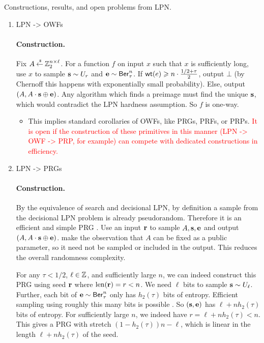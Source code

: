 \noindent Constructions, results, and open problems from LPN. 
\begin{enumerate}
	\item LPN -> OWFs
	\paragraph{Construction.} Fix $A\mathbin{\stackrel{\mbox{\,\tiny \$}}{\gets}} {\mathbb Z}_2^{n\times \ell}$.
	For a function $f$ on input $x$ such that $x$ is sufficiently long, use $x$ to sample ${\mathbf s} \sim U_r$ and ${\mathbf e} \sim \mathsf{Ber}_\tau^n$.
	If $\mathsf{wt}(e) \geqslant n\cdot \frac{1/2+\tau}{2}$, output $\bot$ (by Chernoff this happens with exponentially small probability).
	Else, output $(A, A\cdot{\mathbf s}\oplus{\mathbf e})$.
	Any algorithm which finds a preimage must find the unique ${\mathbf s}$, which would contradict the LPN hardness assumption.
	So $f$ is one-way.
	\begin{itemize}
		\item This implies standard corollaries of OWFs, like PRGs, PRFs, or PRPs.
		\textcolor{red}{It is open if the construction of these primitives in this manner (LPN -> OWF -> PRP, for example) can compete with dedicated constructions in efficiency.}
	\end{itemize}

	\item LPN -> PRGs
	\paragraph{Construction.} By the equivalence of search and decisional LPN, by definition a sample from the decisional LPN problem is already pseudorandom.
	Therefore it is an efficient and simple PRG \cite{C:BFKL93}.
	Use an input ${\mathbf r}$ to sample $A, {\mathbf s}, {\mathbf e}$ and output $(A,A\cdot{\mathbf s}\oplus {\mathbf e})$.
	\cite{C:ACPS09} make the observation that $A$ can be fixed as a public parameter, so it need not be sampled or included in the output.
	This reduces the overall randomness complexity.
	
	For any $\tau < 1/2$, $\ell \in {\mathbb Z}$, and sufficiently large $n$, we can indeed construct this PRG using seed ${\mathbf r}$ where $\mathrm{len}({\mathbf r}) = r < n$.
	We need $\ell$ bits to sample ${\mathbf s} \sim U_\ell$.
	Further, each bit of ${\mathbf e} \sim \mathsf{Ber}_\tau^n$ only has $h_2(\tau)$ bits of entropy.
	Efficient sampling using roughly this many bits is possible \cite{C:ACPS09}.
	So $({\mathbf s}, {\mathbf e})$ has $\ell + nh_2(\tau)$ bits of entropy.
	For sufficiently large $n$, we indeed have $r = \ell + nh_2(\tau) < n$.
	This gives a PRG with stretch $(1 - h_2(\tau))n-\ell$, which is linear in the length $\ell + nh_2(\tau)$ of the seed.
	

\end{enumerate}
